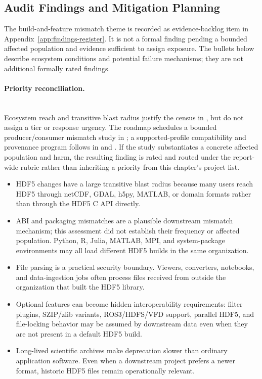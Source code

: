 \documentclass[../main.tex]{subfiles}
\begin{document}
\subsection{Audit Findings and Mitigation Planning}

The build-and-feature mismatch theme is recorded as evidence-backlog item
 in Appendix~\ref{app:findings-register}. It is not a formal
finding pending a bounded affected population and evidence sufficient to assign
exposure. The bullets below describe ecosystem conditions and potential failure
mechanisms; they are not additional formally rated findings.

\paragraph{Priority reconciliation.}\mbox{}\\
Ecosystem reach and transitive blast radius justify the census in ,
but do not assign  a tier or response urgency. The roadmap
schedules a bounded producer/consumer mismatch study in ; a
supported-profile compatibility and provenance program follows in 
and . If the study substantiates a concrete affected population and
harm, the resulting finding is rated and routed under the report-wide rubric
rather than inheriting a priority from this chapter's project list.

\begin{itemize}
    \item HDF5 changes have a large transitive blast radius because many users
    reach HDF5 through netCDF, GDAL, h5py, MATLAB, or domain formats rather than
    through the HDF5 C API directly.
    \item ABI and packaging mismatches are a plausible downstream mismatch
    mechanism; this assessment did not establish their frequency or affected
    population. Python,
    R, Julia, MATLAB, MPI, and system-package environments may all load different
    HDF5 builds in the same organization.
    \item File parsing is a practical security boundary. Viewers, converters,
    notebooks, and data-ingestion jobs often process files received from outside
    the organization that built the HDF5 library.
    \item Optional features can become hidden interoperability requirements:
    filter plugins, SZIP/zlib variants, ROS3/HDFS/VFD support, parallel HDF5,
    and file-locking behavior may be assumed by downstream data even when they
    are not present in a default HDF5 build.
    \item Long-lived scientific archives make deprecation slower than ordinary
    application software. Even when a downstream project prefers a newer format,
    historic HDF5 files remain operationally relevant.
\end{itemize}
\end{document}

